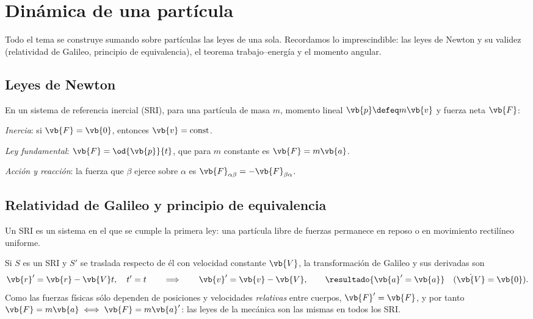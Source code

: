 \section{Dinámica de una partícula}
\label{sec:particula}

Todo el tema se construye sumando sobre partículas las leyes de una sola.
Recordamos lo imprescindible: las leyes de Newton y su validez (relatividad
de Galileo, principio de equivalencia), el teorema trabajo--energía y el
momento angular.

\subsection{Leyes de Newton}

\begin{definicion}
\label{def:newton}
En un sistema de referencia inercial (SRI), para una partícula de masa $m$,
momento lineal $\vb{p}\defeq m\vb{v}$ y fuerza neta $\vb{F}$:
\begin{casos}
  \item \emph{Inercia}: si $\vb{F}=\vb{0}$, entonces $\vb{v}=\text{const}$.
  \item \emph{Ley fundamental}: $\vb{F}=\od{\vb{p}}{t}$, que para $m$ constante es $\vb{F}=m\vb{a}$.
  \item \emph{Acción y reacción}: la fuerza que $\beta$ ejerce sobre $\alpha$ es
        $\vb{F}_{\alpha\beta}=-\vb{F}_{\beta\alpha}$.
\end{casos}
\end{definicion}

\subsection{Relatividad de Galileo y principio de equivalencia}

\begin{definicion}
Un SRI es un sistema en el que se cumple la primera ley: una partícula libre
de fuerzas permanece en reposo o en movimiento rectilíneo uniforme.
\end{definicion}

\begin{teorema}
\label{teo:galileo}
Si $S$ es un SRI y $S'$ se traslada respecto de él con velocidad constante
$\vb{V}$, la transformación de Galileo y sus derivadas son
\begin{equation}
  \vb{r}'=\vb{r}-\vb{V}t,\quad t'=t
  \qquad\Longrightarrow\qquad
  \vb{v}'=\vb{v}-\vb{V},\qquad \resultado{\vb{a}'=\vb{a}}\quad(\dot{\vb{V}}=\vb{0}).
\end{equation}
Como las fuerzas físicas sólo dependen de posiciones y velocidades
\emph{relativas} entre cuerpos, $\vb{F}'=\vb{F}$, y por tanto
$\vb{F}=m\vb{a}\iff\vb{F}=m\vb{a}'$: las leyes de la mecánica son las mismas en
todos los SRI.
\end{teorema}

